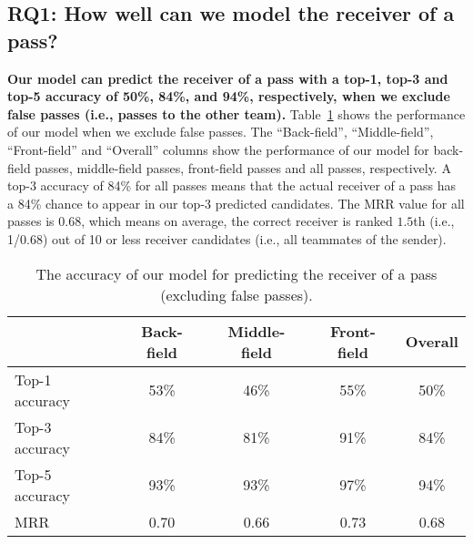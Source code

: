 \subsection{RQ1: How well can we model the receiver of a pass?}\label{RQ2-results}

\textbf{Our model can predict the receiver of a pass with a top-1, top-3 and top-5 accuracy of 50\%, 84\%, and 94\%, respectively, when we exclude false passes (i.e., passes to the other team).}
Table~\ref{tab:performance-accurate-passes} shows the performance of our model when we exclude false passes. 
The ``Back-field'', ``Middle-field'', ``Front-field'' and ``Overall'' columns show the performance of our model for back-field passes, middle-field passes, front-field passes and all passes, respectively. 
A top-3 accuracy of 84\% for all passes means that the actual receiver of a pass has a 84\% chance to appear in our top-3 predicted candidates.
The MRR value for all passes is 0.68, which means on average, the correct receiver is ranked $1.5$th (i.e., 1/0.68) out of 10 or less receiver candidates (i.e., all teammates of the sender).

\begin{table}[!t]
\caption{The accuracy of our model for predicting the receiver of a pass (excluding false passes).}
\centering
\renewcommand{\tabcolsep}{3pt}
\begin{tabular}{lcccc}
  \toprule
  & Back-field & Middle-field & Front-field & Overall \\
  \midrule
  Top-1 accuracy & 53\% & 46\% & 55\% & 50\% \\
  Top-3 accuracy & 84\% & 81\% & 91\% & 84\% \\
  Top-5 accuracy & 93\% & 93\% & 97\% & 94\% \\
  MRR & 0.70 & 0.66 & 0.73 & 0.68 \\
  \bottomrule
\end{tabular}
\label{tab:performance-accurate-passes}
\end{table}

